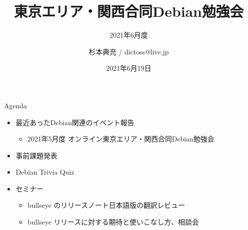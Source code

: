 \title{東京エリア・関西合同Debian勉強会}
\subtitle{2021年6月度} %
\author{杉本典充 / dictoss@live.jp}
\date{2021年6月19日}



\begin{frame}
\titlepage{}
\end{frame}

\begin{frame}{Agenda}
 \begin{minipage}[t]{0.45\hsize}
  \begin{itemize}
  \item 最近あったDebian関連のイベント報告
    \begin{itemize}
    \item 2021年5月度 オンライン東京エリア・関西合同Debian勉強会
    \end{itemize}
  \item 事前課題発表
  \item Debian Trivia Quiz
  \end{itemize}
 \end{minipage}
 \begin{minipage}[t]{0.45\hsize}
   \begin{itemize}
   \item セミナー
     \begin{itemize}
      \item bullseye のリリースノート日本語版の翻訳レビュー
      \item bullseye リリースに対する期待と使いこなし方、相談会
     \end{itemize}
  \end{itemize}
 \end{minipage}
\end{frame}

